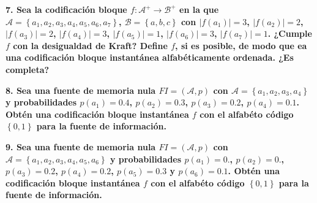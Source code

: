 \documentclass{article}
\begin{document}
\vspace{1cm}

\textbf{
7. Sea la codificación bloque $f:\mathcal{A}^+\rightarrow\mathcal{B}^+$ en la que $\mathcal{A}=\left\{a_1,a_2,a_3,a_4,a_5,a_6,a_7\right\}$, $\mathcal{B}=\left\{a,b,c\right\}$ con $\left|f(a_1)\right|=3$, $\left|f(a_2)\right|=2$, $\left|f(a_3)\right|=2$, $\left|f(a_4)\right|=3$, $\left|f(a_5)\right|=1$, $\left|f(a_6)\right|=3$, $\left|f(a_7)\right|=1$. ¿Cumple $f$ con la desigualdad de Kraft? Define $f$, si es posible, de modo que ea una codificación bloque instantánea alfabéticamente ordenada. ¿Es completa?
}

\vspace{1cm}

\textbf{
8. Sea una fuente de memoria nula $FI=\left(\mathcal{A},p\right)$ con $\mathcal{A}=\left\{a_1,a_2,a_3,a_4\right\}$ y probabilidades $p(a_1)=0.4$, $p(a_2)=0.3$, $p(a_3)=0.2$, $p(a_4)=0.1$. Obtén una codificación bloque instantánea $f$ con el alfabéto código $\left\{0,1\right\}$ para la fuente de información.
}

\vspace{1cm}

\textbf{
9. Sea una fuente de memoria nula $FI=\left(\mathcal{A},p\right)$ con $\mathcal{A}=\left\{a_1,a_2,a_3,a_4,a_5,a_6\right\}$ y probabilidades $p(a_1)=0.  $, $p(a_2)=0.   $, $p(a_3)=0.2$, $p(a_4)=0.2$, $p(a_5)=0.3$ y $p(a_6)=0.1$. Obtén una codificación bloque instantánea $f$ con el alfabéto código $\left\{0,1\right\}$ para la fuente de información.
}
\end{document}
